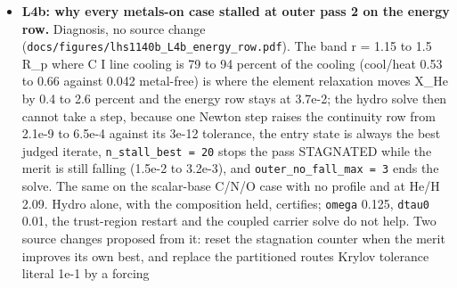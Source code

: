 \documentclass[english,a4paper]{my_memo}
\begin{document}
\begin{itemize}
  default is written with \texttt{sec\_ion=F} in its own coupling header while the
  post-processing pass -\/- which applies the coupling unconditionally and is
  where every reported number comes from -\/- reports the same wind with it.
  MEASURED on the K\_zz = 1e9, He/H = 1.6261 case: certified at outer pass 8
  under STAGED against pass 7 under \texttt{Immediate}, log10 Mdot 8.29 against
  7.87 (archived 7.80, READ), and \texttt{n(He\ 2\^{}3S)} differing by 74 percent beyond
  1.5 R\_p, where the He I 10830 line forms. \texttt{CFL:\ 1.0e-12} is there because
  \texttt{Do\ only\ PP} takes one time step before it stops: at the default CFL the
  written state differs from the state read by 1.2e-6 in rho and 0.59 in v,
  at 1e-12 by 3.6e-14 and 2.3e-12. Found and fixed on the way:
  \texttt{src/utils/element\_flux\_closure.py} wrote the retired \texttt{Valve\ eps:} key into
  every iteration input, so every closure rung had been refused at startup.
  Cost, MEASURED end to end at 8 threads on
  \texttt{atomic\_scalar\_gj1132\_kzz1e9/HeH1.60}: 15 min 15 s, seed to line, of which
  7 outer passes of 117 to 166 s are the wind (final rows mass 5.66e-10,
  momentum 2.76e-13, energy 2.21e-08, worst gated species row 9.32e-06 of
  1.0e-05 at cell 312, \texttt{run.log}; log10 Mdot 7.87 from \texttt{pp.log}, red depth
  4.3260 percent and FWHM 0.25376 A from \texttt{tpm\_He10830\_metrics.txt}).
\item
  \textbf{L4b: why every metals-on case stalled at outer pass 2 on the energy
  row.} Diagnosis, no source change
  (\texttt{docs/figures/lhs1140b\_L4b\_energy\_row.pdf}). The band r = 1.15 to 1.5 R\_p
  where C I line cooling is 79 to 94 percent of the cooling (cool/heat 0.53
  to 0.66 against 0.042 metal-free) is where the element relaxation moves
  X\_He by 0.4 to 2.6 percent and the energy row stays at 3.7e-2; the hydro
  solve then cannot take a step, because one Newton step raises the
  continuity row from 2.1e-9 to 6.5e-4 against its 3e-12 tolerance, the entry
  state is always the best judged iterate, \texttt{n\_stall\_best\ =\ 20} stops the pass
  STAGNATED while the merit is still falling (1.5e-2 to 3.2e-3), and
  \texttt{outer\_no\_fall\_max\ =\ 3} ends the solve. The same on the scalar-base C/N/O
  case with no profile and at He/H 2.09. Hydro alone, with the composition
  held, certifies; \texttt{omega} 0.125, \texttt{dtau0} 0.01, the trust-region restart and
  the coupled carrier solve do not help. Two source changes proposed from it:
  reset the stagnation counter when the merit improves its own best, and
  replace the partitioned route\textquotesingle s Krylov tolerance literal 1e-1 by a forcing

\end{itemize}
\end{document}
